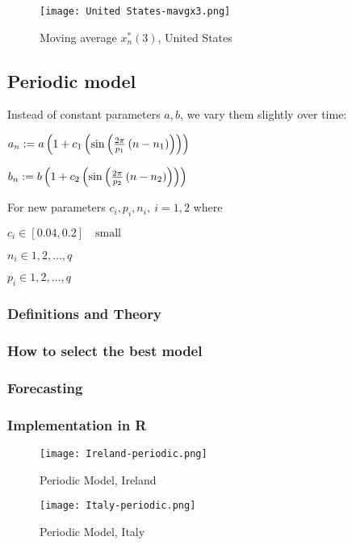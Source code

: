\begin{figure}[H]
\texttt{[image: United States-mavgx3.png]}
\endminipage 
\caption{Moving average $x^*_n (3)$, United States}
\end{figure}

\subsection{Periodic model}

Instead of constant parameters $a,b$, we vary them slightly over time:

$a_n := a\left(1+c_1\left(\sin\left(\frac{2\pi}{p_1}\left(n-n_1\right)\right)\right)\right)$

$b_n := b\left(1+c_2\left(\sin\left(\frac{2\pi}{p_2}\left(n-n_2\right)\right)\right)\right)$

For new parameters $c_i,p_i,n_i, \ i=1,2$ where

$c_i  \in [0.04, 0.2] \quad \text{small}$

$n_i  \in 1,2,\dots,q$

$p_i  \in 1,2,\dots,q$

\subsubsection{Definitions and Theory}

\subsubsection{How to select the best model}

\subsubsection{Forecasting}

\subsubsection{Implementation in R}

\begin{figure}[H]
  \texttt{[image: Ireland-periodic.png]} \label{fig:usa-periodic}
\endminipage
\caption{Periodic Model, Ireland}
\end{figure}

\begin{figure}[H]
  \texttt{[image: Italy-periodic.png]} \label{fig:italy-periodic}
\endminipage 
\caption{Periodic Model, Italy}
\end{figure}

